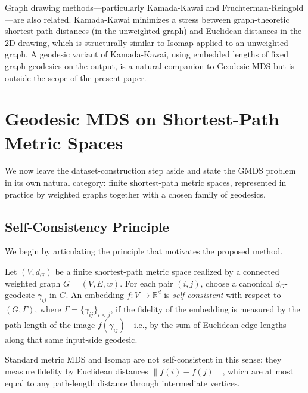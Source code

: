\documentclass[twoside,11pt]{article}
\newcommand{\R}{\mathbb{R}}
\newcommand{\norm}[1]{\left\|#1\right\|}
\begin{document}
Graph drawing methods---particularly Kamada-Kawai \citep{kamada1989algorithm}
and Fruchterman-Reingold \citep{fruchterman1991graph}---are also related.
Kamada-Kawai minimizes a stress between graph-theoretic shortest-path
distances (in the unweighted graph) and Euclidean distances in the 2D
drawing, which is structurally similar to Isomap applied to an unweighted
graph.  A geodesic variant of Kamada-Kawai, using embedded lengths of
fixed graph geodesics on the output, is a natural companion to Geodesic
MDS but is outside the scope of the present paper.

\section{Geodesic MDS on Shortest-Path Metric Spaces}
\label{sec:geodesic_mds_v4}
\label{sec:geodesic_mds}

We now leave the dataset-construction step aside and state the GMDS problem in
its own natural category: finite shortest-path metric spaces, represented in
practice by weighted graphs together with a chosen family of geodesics.

\subsection{Self-Consistency Principle}
\label{sec:self_consistency}

We begin by articulating the principle that motivates the proposed method.

\begin{definition}
  \label{def:self_consistency}
  Let $(V, d_G)$ be a finite shortest-path metric space realized by a
  connected weighted graph $G = (V, E, w)$.  For each pair $(i,j)$, choose a
  canonical $d_G$-geodesic $\gamma_{ij}$ in $G$.  An embedding
  $f: V \to \R^d$ is
  \emph{self-consistent} with respect to $(G, \Gamma)$, where
  $\Gamma = \{\gamma_{ij}\}_{i<j}$, if the fidelity of the embedding is
  measured by the path length of the image $f(\gamma_{ij})$---i.e., by the
  sum of Euclidean edge lengths along that same input-side geodesic.
\end{definition}

Standard metric MDS and Isomap are not self-consistent in this sense:
they measure fidelity by Euclidean distances $\norm{f(i) - f(j)}$, which
are at most equal to any path-length distance through intermediate vertices.
\end{document}
